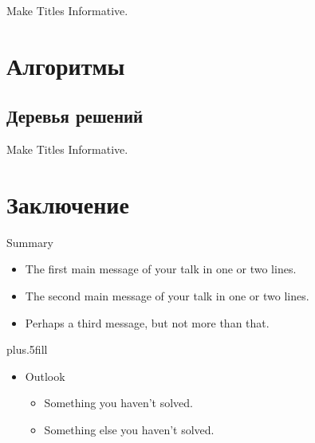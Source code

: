 \documentclass{beamer}
\begin{document}
\begin{frame}{Make Titles Informative.}
\end{frame}


\section{Алгоритмы}
\subsection{Деревья решений}

\begin{frame}{Make Titles Informative.}
\end{frame}

\section*{Заключение}

\begin{frame}{Summary}

  \begin{itemize}
    \item
      The \alert{first main message} of your talk in one or two lines.
    \item
      The \alert{second main message} of your talk in one or two lines.
    \item
      Perhaps a \alert{third message}, but not more than that.
  \end{itemize}

  \vskip0pt plus.5fill
  \begin{itemize}
    \item
      Outlook
      \begin{itemize}
        \item
          Something you haven't solved.
        \item
          Something else you haven't solved.
      \end{itemize}
  \end{itemize}
\end{frame}

\begin{frame}
  \titlepage
\end{frame}
\end{document}
